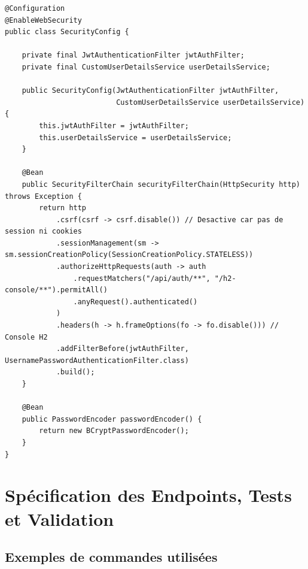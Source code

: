 \documentclass{rapportFSR}
\begin{document}
\begin{lstlisting}[style=java, caption={Configuration de sécurité stateless (SecurityConfig)}]
@Configuration
@EnableWebSecurity
public class SecurityConfig {

    private final JwtAuthenticationFilter jwtAuthFilter;
    private final CustomUserDetailsService userDetailsService;

    public SecurityConfig(JwtAuthenticationFilter jwtAuthFilter, 
                          CustomUserDetailsService userDetailsService) {
        this.jwtAuthFilter = jwtAuthFilter;
        this.userDetailsService = userDetailsService;
    }

    @Bean
    public SecurityFilterChain securityFilterChain(HttpSecurity http) throws Exception {
        return http
            .csrf(csrf -> csrf.disable()) // Desactive car pas de session ni cookies
            .sessionManagement(sm -> sm.sessionCreationPolicy(SessionCreationPolicy.STATELESS))
            .authorizeHttpRequests(auth -> auth
                .requestMatchers("/api/auth/**", "/h2-console/**").permitAll()
                .anyRequest().authenticated()
            )
            .headers(h -> h.frameOptions(fo -> fo.disable())) // Console H2
            .addFilterBefore(jwtAuthFilter, UsernamePasswordAuthenticationFilter.class)
            .build();
    }

    @Bean
    public PasswordEncoder passwordEncoder() {
        return new BCryptPasswordEncoder();
    }
}
\end{lstlisting}



\section{Spécification des Endpoints, Tests et Validation}

\subsection*{Exemples de commandes utilisées}

\end{document}
